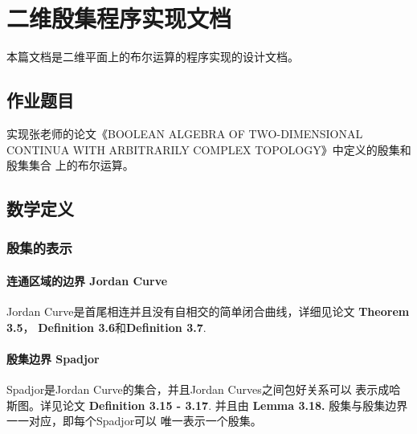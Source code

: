 \documentclass[a4paper]{book}
\makeatletter
\newcommand{\voidenvironment}[1]{%
  \expandafter\providecommand\csname env@#1@save@env\endcsname{}%
  \expandafter\providecommand\csname env@#1@process\endcsname{}%
  \@ifundefined{#1}{}{\RenewEnviron{#1}{}}%
}
\numberwithin{equation}{chapter}
\theoremstyle{definition}
\makeatother
\begin{document}
\pagestyle{empty}

\tableofcontents
\clearpage

\pagestyle{fancy}
\fancyhead{}
\rhead{\today}

\setcounter{chapter}{-1}




\chapter{二维殷集程序实现文档}
本篇文档是二维平面上的布尔运算的程序实现的设计文档。


\section{\heiti 作业题目}
实现张老师的论文《BOOLEAN ALGEBRA OF TWO-DIMENSIONAL CONTINUA
WITH ARBITRARILY COMPLEX TOPOLOGY》中定义的殷集和殷集集合
上的布尔运算。

\section{\heiti 数学定义}
\subsection{殷集的表示}
\subsubsection{连通区域的边界 Jordan Curve}
Jordan Curve是首尾相连并且没有自相交的简单闭合曲线，详细见论文 \textbf{Theorem 3.5}，
\textbf{Definition 3.6}和\textbf{Definition 3.7}.

\subsubsection{殷集边界 Spadjor}
Spadjor是Jordan Curve的集合，并且Jordan Curves之间包好关系可以
表示成哈斯图。详见论文 \textbf{Definition 3.15 - 3.17}.
并且由 \textbf{Lemma 3.18.} 殷集与殷集边界一一对应，即每个Spadjor可以
唯一表示一个殷集。
\end{document}
